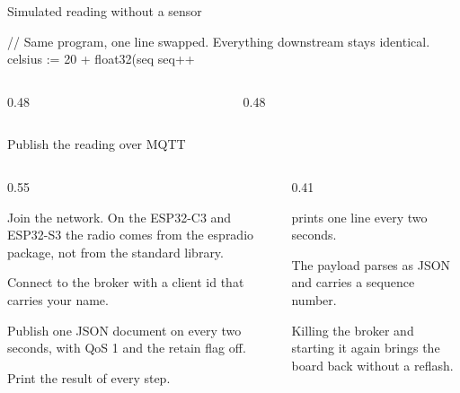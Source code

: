 \documentclass[10pt,aspectratio=169,t]{beamer}
\begin{document}
\begin{frame}[embedded,fragile,eyebrow=Task I]{Simulated reading without a sensor}
  \vskip 1mm
\begin{golang}
// Same program, one line swapped. Everything downstream stays identical.
celsius := 20 + float32(seq%
seq++
\end{golang}
  \vskip 2mm
  \begin{columns}[T]
    \begin{column}{0.48\textwidth}
    \end{column}
    \begin{column}{0.48\textwidth}
    \end{column}
  \end{columns}
  \vskip 1mm
\end{frame}

\begin{frame}[embedded,eyebrow=Task II]{Publish the reading over MQTT}
  \begin{columns}[T]
    \begin{column}{0.55\textwidth}
      \begin{steps}
        \item Join the network. On the ESP32-C3 and ESP32-S3 the radio comes from the espradio package, not from the standard library.
        \item Connect to the broker with a client id that carries your name.
        \item Publish one JSON document on  every two seconds, with QoS 1 and the retain flag off.
        \item Print the result of every step.
      \end{steps}
    \end{column}
    \begin{column}{0.41\textwidth}
      \begin{checklist}
        \item {} prints one line every two seconds.
        \item The payload parses as JSON and carries a sequence number.
        \item Killing the broker and starting it again brings the board back without a reflash.
      \end{checklist}
    \end{column}
  \end{columns}
\end{frame}
\end{document}
